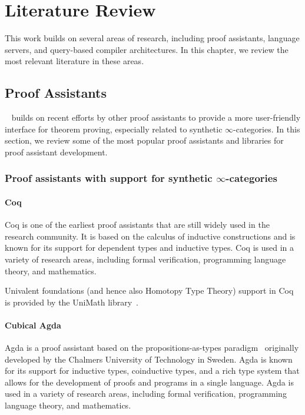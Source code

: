 \chapter{Literature Review}
\label{chap:lr}

This work builds on several areas of research, including proof assistants, language servers,
and query-based compiler architectures.
In this chapter, we review the most relevant literature in these areas.

\section{Proof Assistants}

\Rzk{}~\cite{kudasov2023experimental} builds on recent efforts by other proof assistants to provide a
more user-friendly interface for theorem proving, especially related to synthetic $\infty$-categories.
In this section, we review some of the most popular proof assistants and libraries for proof assistant development.

\subsection{Proof assistants with support for synthetic $\infty$-categories}

\subsubsection{Coq}

Coq \cite{huet1997coq} is one of the earliest proof assistants that are still widely used in the research community.
It is based on the calculus of inductive constructions and is known for its support for dependent types and inductive types.
Coq is used in a variety of research areas, including formal verification, programming language theory, and mathematics.

Univalent foundations (and hence also Homotopy Type Theory) support in Coq is provided by the UniMath library~\cite{DanielGrayson2024}\cite{MacPherson2019}.

\subsubsection{Cubical Agda}

Agda \cite{BoveDybjerNorell2009} is a proof assistant based on the propositions-as-types paradigm~\cite{Wadler2015} originally developed by the Chalmers University of Technology in Sweden.
Agda is known for its support for inductive types, coinductive types, and a rich type system that allows for the
development of proofs and programs in a single language.
Agda is used in a variety of research areas, including formal verification, programming language theory, and mathematics.

